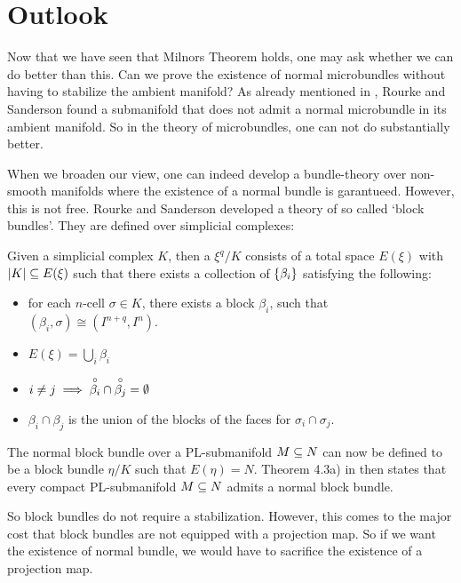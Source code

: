\section{Outlook}\label{chapter::outlook}
\begin{myparagraph}
    Now that we have seen that Milnors Theorem holds,
    one may ask whether we can do better than this.
    Can we prove the existence of normal microbundles without having to stabilize
    the ambient manifold? As already mentioned in ,
    Rourke and Sanderson found a submanifold that does not admit a normal microbundle
    in its ambient manifold.
    So in the theory of microbundles, one can not do substantially better.

    When we broaden our view,
    one can indeed develop a bundle-theory over non-smooth manifolds
    where the existence of a normal bundle is garantueed.
    However, this is not free.
    Rourke and Sanderson developed a theory of so called `block bundles'.
    They are defined over simplicial complexes:
    
    Given a simplicial complex $K$, then a  $\xi^q/K$
    consists of a total space $E(\xi)$ with $\vert{} K \vert{} \subseteq{} E(\xi)$ such that
    there exists a collection of  $\{\beta_i\}$ satisfying the following:
    \begin{itemize}
        \item for each $n$-cell $\sigma \in K$, there exists a block $\beta_i$, such that $(\beta_i, \sigma) \cong (I^{n + q}, I^n)$.
        \item $E(\xi) = \bigcup_{i} \beta_i$
        \item $i \neq j \implies \overset{\circ}{\beta_i} \cap \overset{\circ}{\beta_j} = \emptyset$
        \item $\beta_i \cap \beta_j$ is the union of the blocks of the faces for $\sigma_i \cap \sigma_j$.
    \end{itemize}

    The normal block bundle over a PL-submanifold $M \subseteq{} N$ can now be defined to be a block bundle $\eta/K$ such that $E(\eta) = N$.
    Theorem 4.3a) in \cite{block} then states that every compact PL-submanifold $M \subseteq{} N$ admits a normal block bundle.
    
    So block bundles do not require a stabilization.
    However, this comes to the major cost that block bundles are not equipped with a projection map.
    So if we want the existence of normal bundle, we would have to sacrifice the existence of a projection map.
\end{myparagraph}